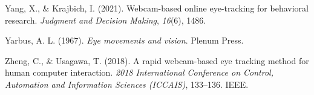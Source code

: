 \documentclass[
  man,floatsintext]{apa6}
\newlength{\cslhangindent}
\newenvironment{CSLReferences}[2] %
 {\begin{list}{}{%
  \setlength{\itemindent}{0pt}
  \setlength{\leftmargin}{0pt}
  \setlength{\parsep}{0pt}
  \ifodd #1
   \setlength{\leftmargin}{\cslhangindent}
   \setlength{\itemindent}{-1\cslhangindent}
  \fi
  \setlength{\itemsep}{#2\baselineskip}}}
 {\end{list}}
\begin{document}
\begin{CSLReferences}{1}{0}
Yang, X., \& Krajbich, I. (2021). Webcam-based online eye-tracking for behavioral research. \emph{Judgment and Decision Making}, \emph{16}(6), 1486.

Yarbus, A. L. (1967). \emph{Eye movements and vision}. Plenum Press.

Zheng, C., \& Usagawa, T. (2018). A rapid webcam-based eye tracking method for human computer interaction. \emph{2018 International Conference on Control, Automation and Information Sciences (ICCAIS)}, 133--136. IEEE.

\end{CSLReferences}

\endgroup
\end{document}
